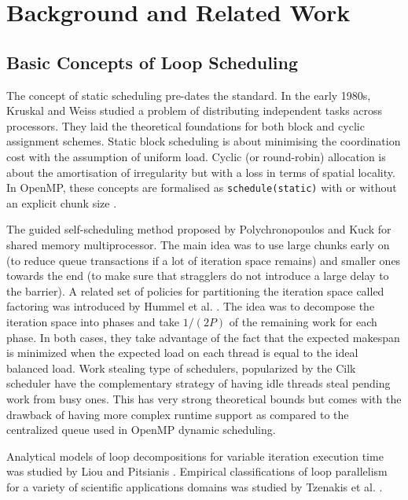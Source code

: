 \documentclass[conference]{IEEEtran}
\begin{document}
\section{Background and Related Work}

\subsection{Basic Concepts of Loop Scheduling}

The concept of static scheduling pre-dates the standard. In the early 1980s, Kruskal and Weiss \cite{kruskal1985allocating} studied a problem of distributing independent tasks across processors. They laid the theoretical foundations for both block and cyclic assignment schemes. Static block scheduling is about minimising the coordination cost with the assumption of uniform load. Cyclic (or round-robin) allocation is about the amortisation of irregularity but with a loss in terms of spatial locality. In OpenMP, these concepts are formalised as \texttt{schedule(static)} with or without an explicit chunk size \cite{openmp2021spec52}.

The guided self-scheduling method proposed by Polychronopoulos and Kuck \cite{polychronopoulos1987guided} for shared memory multiprocessor. The main idea was to use large chunks early on (to reduce queue transactions if a lot of iteration space remains) and smaller ones towards the end (to make sure that stragglers do not introduce a large delay to the barrier). A related set of policies for partitioning the iteration space called factoring was introduced by Hummel et al. \cite{hummel1992factoring}. The idea was to decompose the iteration space into phases and take \(1/(2P)\) of the remaining work for each phase. In both cases, they take advantage of the fact that the expected makespan is minimized when the expected load on each thread is equal to the ideal balanced load. Work stealing type of schedulers, popularized by the Cilk scheduler \cite{blumofe1999scheduling,agrawal2010cilk} have the complementary strategy of having idle threads steal pending work from busy ones. This has very strong theoretical bounds but comes with the drawback of having more complex runtime support as compared to the centralized queue used in OpenMP dynamic scheduling.

Analytical models of loop decompositions for variable iteration execution time was studied by Liou and Pitsianis \cite{liou1997hyperbolic}. Empirical classifications of loop parallelism for a variety of scientific applications domains was studied by Tzenakis et al. \cite{tzenakis2012bddt}.
\end{document}
